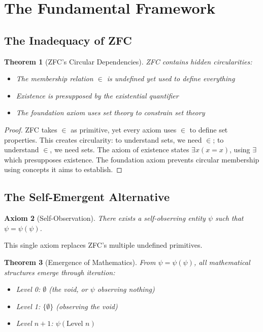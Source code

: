 \documentclass[12pt]{article}
\newtheorem{theorem}{Theorem}[section]
\newtheorem{axiom}[theorem]{Axiom}
\begin{document}
\section{The Fundamental Framework}

\subsection{The Inadequacy of ZFC}

\begin{theorem}[ZFC's Circular Dependencies]
ZFC contains hidden circularities:
\begin{itemize}
\item The membership relation $\in$ is undefined yet used to define everything
\item Existence is presupposed by the existential quantifier
\item The foundation axiom uses set theory to constrain set theory
\end{itemize}
\end{theorem}

\begin{proof}
ZFC takes $\in$ as primitive, yet every axiom uses $\in$ to define set properties. This creates circularity: to understand sets, we need $\in$; to understand $\in$, we need sets. The axiom of existence states $\exists x(x = x)$, using $\exists$ which presupposes existence. The foundation axiom prevents circular membership using concepts it aims to establish.
\end{proof}

\subsection{The Self-Emergent Alternative}

\begin{axiom}[Self-Observation]
There exists a self-observing entity $\psi$ such that $\psi = \psi(\psi)$.
\end{axiom}

This single axiom replaces ZFC's multiple undefined primitives.

\begin{theorem}[Emergence of Mathematics]
From $\psi = \psi(\psi)$, all mathematical structures emerge through iteration:
\begin{itemize}
\item Level 0: $\emptyset$ (the void, or $\psi$ observing nothing)
\item Level 1: $\{\emptyset\}$ (observing the void)
\item Level $n+1$: $\psi(\text{Level } n)$
\end{itemize}
\end{theorem}
\end{document}
